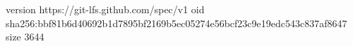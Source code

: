 version https://git-lfs.github.com/spec/v1
oid sha256:bbf81b6d40692b1d7895bf2169b5ec05274e56bcf23c9e19edc543c837af8647
size 3644
